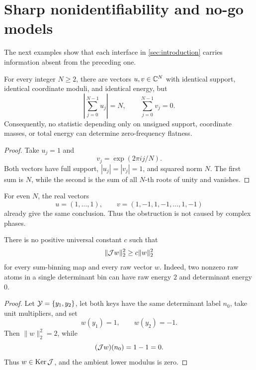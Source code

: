 \section{Sharp nonidentifiability and no-go models}
\label{sec:nonidentifiability}

The next examples show that each interface in
\cref{sec:introduction} carries information absent from the preceding
one.

\begin{proposition}
\label{prop:unsigned-no-go}
For every integer \(N\ge2\), there are vectors \(u,v\in\mathbb C^N\) with
identical support, identical coordinate moduli, and identical energy,
but
\begin{equation}
 \left|\sum_{j=0}^{N-1}u_j\right|=N,
 \qquad
 \sum_{j=0}^{N-1}v_j=0.
 \label{eq:phase-no-go}
\end{equation}
Consequently, no statistic depending only on unsigned support,
coordinate masses, or total energy can determine zero-frequency
flatness.
\end{proposition}

\begin{proof}
Take \(u_j=1\) and
\[
 v_j=\exp(2\pi i j/N).
\]
Both vectors have full support, \(|u_j|=|v_j|=1\), and squared norm
\(N\).  The first sum is \(N\), while the second is the sum of all
\(N\)-th roots of unity and vanishes.
\end{proof}

\begin{remark}
For even \(N\), the real vectors
\[
 u=(1,\ldots,1),
 \qquad
 v=(1,-1,1,-1,\ldots,1,-1)
\]
already give the same conclusion.  Thus the obstruction is not
caused by complex phases.
\end{remark}

\begin{proposition}
\label{prop:bin-cancellation}
There is no positive universal constant \(c\) such that
\[
 \|\mathcal J w\|_2^2\ge c\|w\|_2^2
\]
for every sum-binning map and every raw vector \(w\).
Indeed, two nonzero raw atoms in a single determinant bin can have raw
energy \(2\) and determinant energy \(0\).
\end{proposition}

\begin{proof}
Let \(\mathcal Y=\{y_1,y_2\}\), let both keys have the same determinant
label \(n_0\), take unit multipliers, and set
\[
 w(y_1)=1,\qquad w(y_2)=-1.
\]
Then \(\|w\|_2^2=2\), while
\[
 (\mathcal J w)(n_0)=1-1=0.
\]
Thus \(w\in\operatorname{Ker}\mathcal J\), and the ambient lower modulus is zero.
\end{proof}

